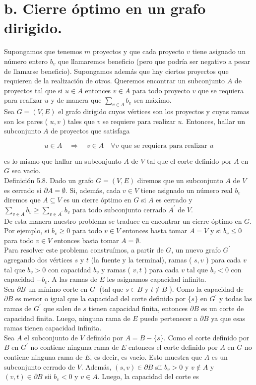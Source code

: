 \documentclass[10pt]{article}
\begin{document}
\section*{b. Cierre óptimo en un grafo dirigido.}
Supongamos que tenemos $m$ proyectos y que cada proyecto $v$ tiene asignado un número entero $b_{v}$ que llamaremos beneficio (pero que podría ser negativo a pesar de llamarse beneficio). Supongamos además que hay ciertos proyectos que requieren de la realización de otros. Queremos encontrar un subconjunto $A$ de\\
proyectos tal que si $u \in A$ entonces $v \in A$ para todo proyecto $v$ que se requiera para realizar $u$ y de manera que $\sum_{v \in A} b_{v}$ sea máximo.\\
Sea $G=(V, E)$ el grafo dirigido cuyos vértices son los proyectos y cuyas ramas son los pares ( $u, v$ ) tales que $v$ se requiere para realizar $u$. Entonces, hallar un subconjunto $A$ de proyectos que satisfaga

$$
u \in A \quad \Longrightarrow \quad v \in A \quad \forall v \text { que se requiera para realizar } u
$$

es lo mismo que hallar un subconjunto $A$ de $V$ tal que el corte definido por $A$ en $G$ sea vacío.\\
Definición 5.8. Dado un grafo $G=(V, E)$ diremos que un subconjunto $A$ de $V$ es cerrado si $\partial A=\emptyset$. Si, además, cada $v \in V$ tiene asignado un número real $b_{v}$ diremos que $A \subseteq V$ es un cierre óptimo en $G$ si $A$ es cerrado y $\sum_{v \in A} b_{v} \geq \sum_{v \in A^{\prime}} b_{v}$ para todo subconjunto cerrado $A^{\prime}$ de $V$.\\
De esta manera nuestro problema se traduce en encontrar un cierre óptimo en $G$. Por ejemplo, si $b_{v} \geq 0$ para todo $v \in V$ entonces basta tomar $A=V$ y si $b_{v} \leq 0$ para todo $v \in V$ entonces basta tomar $A=\emptyset$.\\
Para resolver este problema construímos, a partir de $G$, un nuevo grafo $G^{\prime}$ agregando dos vértices $s$ y $t$ (la fuente y la terminal), ramas ( $s, v$ ) para cada $v$ tal que $b_{v}>0$ con capacidad $b_{v}$ y ramas ( $v, t$ ) para cada $v$ tal que $b_{v}<0$ con capacidad $-b_{v}$. A las ramas de $E$ les asignamos capacidad infinita.\\
Sea $\partial B$ un mínimo corte en $G^{\prime}$ (tal que $s \in B$ y $t \notin B$ ). Como la capacidad de $\partial B$ es menor o igual que la capacidad del corte definido por $\{s\}$ en $G^{\prime}$ y todas las ramas de $G^{\prime}$ que salen de $s$ tienen capacidad finita, entonces $\partial B$ es un corte de capacidad finita. Luego, ninguna rama de $E$ puede pertenecer a $\partial B$ ya que esas ramas tienen capacidad infinita.\\
Sea $A$ el subconjunto de $V$ definido por $A=B-\{s\}$. Como el corte definido por $B$ en $G^{\prime}$ no contiene ninguna rama de $E$ entonces el corte definido por $A$ en $G$ no contiene ninguna rama de $E$, es decir, es vacío. Esto muestra que $A$ es un subconjunto cerrado de $V$. Además, $(s, v) \in \partial B$ sii $b_{v}>0$ y $v \notin A$ y $(v, t) \in \partial B$ sii $b_{v}<0$ y $v \in A$. Luego, la capacidad del corte es
\end{document}
